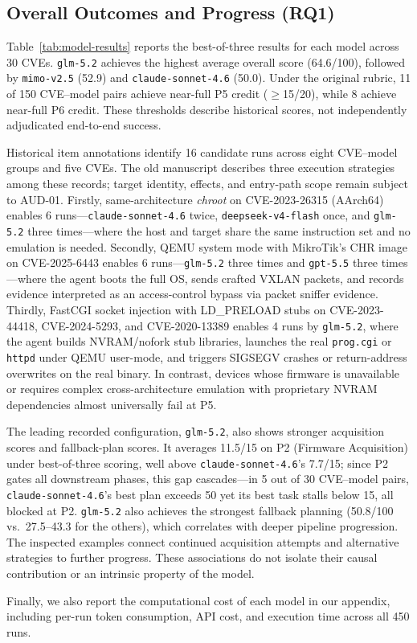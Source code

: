 \subsection{Overall Outcomes and Progress (RQ1)}
Table~\ref{tab:model-results} reports the best-of-three results for each model across 30 CVEs. \texttt{glm-5.2} achieves the highest average overall score (64.6/100), followed by \texttt{mimo-v2.5} (52.9) and \texttt{claude-sonnet-4.6} (50.0). Under the original rubric, 11 of 150 CVE--model pairs achieve near-full P5 credit ($\geq$15/20), while 8 achieve near-full P6 credit. These thresholds describe historical scores, not independently adjudicated end-to-end success.


Historical item annotations identify 16 candidate runs across eight CVE--model groups and five CVEs. The old manuscript describes three execution strategies among these records; target identity, effects, and entry-path scope remain subject to AUD-01. Firstly, same-architecture \textit{chroot} on CVE-2023-26315 (AArch64) enables 6 runs---\texttt{claude-sonnet-4.6} twice, \texttt{deepseek-v4-flash} once, and \texttt{glm-5.2} three times---where the host and target share the same instruction set and no emulation is needed. Secondly, QEMU system mode with MikroTik's CHR image on CVE-2025-6443 enables 6 runs---\texttt{glm-5.2} three times and \texttt{gpt-5.5} three times---where the agent boots the full OS, sends crafted VXLAN packets, and records evidence interpreted as an access-control bypass via packet sniffer evidence. Thirdly, FastCGI socket injection with LD\_PRELOAD stubs on CVE-2023-44418, CVE-2024-5293, and CVE-2020-13389 enables 4 runs by \texttt{glm-5.2}, where the agent builds NVRAM/nofork stub libraries, launches the real \texttt{prog.cgi} or \texttt{httpd} under QEMU user-mode, and triggers SIGSEGV crashes or return-address overwrites on the real binary. In contrast, devices whose firmware is unavailable or requires complex cross-architecture emulation with proprietary NVRAM dependencies almost universally fail at P5.


The leading recorded configuration, \texttt{glm-5.2}, also shows stronger acquisition scores and fallback-plan scores. It averages 11.5/15 on P2 (Firmware Acquisition) under best-of-three scoring, well above \texttt{claude-sonnet-4.6}'s 7.7/15; since P2 gates all downstream phases, this gap cascades---in 5 out of 30 CVE--model pairs, \texttt{claude-sonnet-4.6}'s best plan exceeds 50 yet its best task stalls below 15, all blocked at P2. \texttt{glm-5.2} also achieves the strongest fallback planning (50.8/100 vs.\ 27.5--43.3 for the others), which correlates with deeper pipeline progression. The inspected examples connect continued acquisition attempts and alternative strategies to further progress. These associations do not isolate their causal contribution or an intrinsic property of the model.

Finally, we also report the computational cost of each model in our appendix, including per-run token consumption, API cost, and execution time across all 450 runs.
